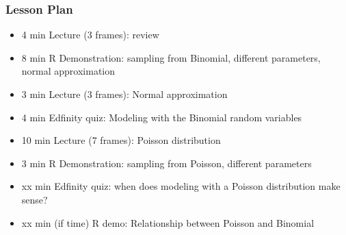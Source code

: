 \begin{frame}
    \frametitle{Lesson Plan}
    \begin{itemize}
        \item 4 min Lecture (3 frames): review
        \item 8 min R Demonstration: sampling from Binomial, different parameters, normal approximation
        \item 3 min Lecture (3 frames): Normal approximation
        \item 4 min Edfinity quiz: Modeling with the Binomial random variables
        
        \item 10 min Lecture (7 frames): Poisson distribution
        \item 3 min R Demonstration: sampling from Poisson, different parameters
        \item xx min Edfinity quiz: when does modeling with a Poisson distribution make sense?
        \item xx min (if time) R demo: Relationship between Poisson and Binomial
    \end{itemize}
\end{frame}
    


